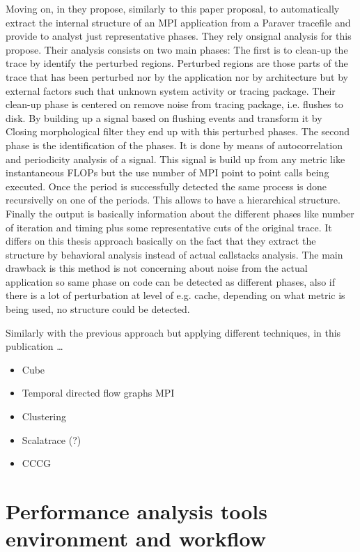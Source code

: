 \documentclass[12pt]{report}
\begin{document}
Moving on, in \cite{casas2007automatic} they propose, similarly to this paper proposal, to automatically extract the internal structure of an MPI application from a
Paraver tracefile and provide to analyst just representative phases. 
They rely onsignal analysis for this propose. 
Their analysis consists on two main phases:
The first is to clean-up the trace by identify the perturbed regions.
Perturbed regions are those parts of the trace that has been perturbed nor by
the application nor by architecture but by external factors such that unknown
system activity or tracing package. Their clean-up phase is centered on remove
noise from tracing package, i.e. flushes to disk. By building up a signal based
on flushing events and transform it by Closing morphological filter they end up
with this perturbed phases. The second phase is the identification of the
phases. It is done by means of autocorrelation and periodicity analysis of a
signal. This signal is build up from any metric like instantaneous FLOPs but the
use number of MPI point to point calls being executed. Once the period is
successfully detected the same process is done recursivelly on one of the
periods. This allows to have a hierarchical structure. Finally the output is
basically information about the different phases like number of iteration and
timing plus some representative cuts of the original trace. It differs on this
thesis approach basically on the fact that they extract the structure by
behavioral analysis instead of actual callstacks analysis. The main drawback is
this method is not concerning about noise from the actual application so same
phase on code can be detected as different phases, also if there is a lot of
perturbation at level of e.g. cache, depending on what metric is being used, no
structure could be detected. 

Similarly with the previous approach but applying different techniques, in this
publication \cite{gonzalez2013application} \dots

\begin{itemize}
  \item Cube
  \item Temporal directed flow graphs MPI
  \item Clustering
  \item Scalatrace (?)
  \item CCCG
\end{itemize}

\section{Performance analysis tools environment and workflow}\label{s:pt_evironment}
\end{document}
